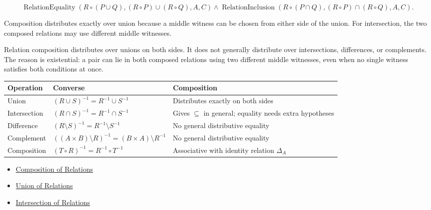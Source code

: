 \begin{remark*}
\[
  \operatorname{RelationEquality}(R\circ(P\cup Q),(R\circ P)\cup(R\circ Q),A,C)
  \wedge
  \operatorname{RelationInclusion}(R\circ(P\cap Q),(R\circ P)\cap(R\circ Q),A,C).
\]
\end{remark*}

\begin{remark*}[Interpretation]
Composition distributes exactly over union because a middle witness can be
chosen from either side of the union. For intersection, the two composed
relations may use different middle witnesses.
\end{remark*}

\begin{remark*}[Exposition]
Relation composition distributes over unions on both sides. It does not
generally distribute over intersections, differences, or complements. The
reason is existential: a pair can lie in both composed relations using two
different middle witnesses, even when no single witness satisfies both
conditions at once.
\end{remark*}

\begin{remark*}[Exposition]
\mbox{}\par\smallskip
\small
\begin{tabularx}{\textwidth}{l X X}
\toprule
\textbf{Operation} & \textbf{Converse} & \textbf{Composition} \\
\midrule
Union
& $(R\cup S)^{-1}=R^{-1}\cup S^{-1}$
& Distributes exactly on both sides \\
Intersection
& $(R\cap S)^{-1}=R^{-1}\cap S^{-1}$
& Gives $\subseteq$ in general; equality needs extra hypotheses \\
Difference
& $(R\setminus S)^{-1}=R^{-1}\setminus S^{-1}$
& No general distributive equality \\
Complement
& $((A\times B)\setminus R)^{-1}=(B\times A)\setminus R^{-1}$
& No general distributive equality \\
Composition
& $(T\circ R)^{-1}=R^{-1}\circ T^{-1}$
& Associative with identity relation $\Delta_A$ \\
\bottomrule
\end{tabularx}
\end{remark*}

\begin{dependencies}
\begin{itemize}
  \item \hyperref[def:relation-composition]{Composition of Relations}
  \item \hyperref[def:relation-union]{Union of Relations}
  \item \hyperref[def:relation-intersection]{Intersection of Relations}
\end{itemize}
\end{dependencies}

